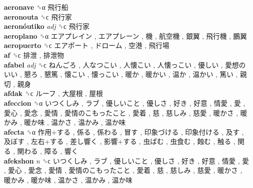 \textbf{aeronave} ␝α   飛行船   \\
\textbf{aeronouta} ␝ϲ   飛行家   \\
\textbf{aeronóutiko} \emph{adj}  ␝ϲ   飛行家   \\
\textbf{aeroplano} ␝α   エアプレイン ,  エアプレーン ,  機 ,  航空機 ,  銀翼 ,  飛行機 ,  鵬翼   \\
\textbf{aeropuerto} ␝ϲ   エアポート ,  ドローム ,  空港 ,  飛行場   \\
\textbf{af} ␝ϲ   排泄 ,  排泄物   \\
\textbf{afabel} \emph{adj}  ␝ϲ   ねんごろ ,  人なつこい ,  人懐こい ,  人懐っこい ,  優しい ,  愛想のいい ,  懇ろ ,  懇篤 ,  懐こい ,  懐っこい ,  暖か ,  暖かい ,  温か ,  温かい ,  篤い ,  親切 ,  親身   \\
\textbf{afdak} ␝ϲ   ルーフ ,  大屋根 ,  屋根   \\
\textbf{afeccion} ␝α   いつくしみ ,  ラブ ,  優しいこと ,  優しさ ,  好き ,  好意 ,  情愛 ,  愛 ,  愛心 ,  愛念 ,  愛情 ,  愛情のこもったこと ,  愛着 ,  慈 ,  慈しみ ,  慈愛 ,  暖かさ ,  暖かみ ,  暖か味 ,  温かさ ,  温かみ ,  温か味   \\
\textbf{afecta} ␝α   作用+する ,  係る ,  係わる ,  冒す ,  印象づける ,  印象付ける ,  及す ,  及ぼす ,  左右+する ,  差し響く ,  影響+する ,  虫ばむ ,  虫食む ,  蝕む ,  触る ,  関る ,  関わる ,  障る ,  響く   \\
\textbf{afekshon} \emph{n}  ␝ϲ   いつくしみ ,  ラブ ,  優しいこと ,  優しさ ,  好き ,  好意 ,  情愛 ,  愛 ,  愛心 ,  愛念 ,  愛情 ,  愛情のこもったこと ,  愛着 ,  慈 ,  慈しみ ,  慈愛 ,  暖かさ ,  暖かみ ,  暖か味 ,  温かさ ,  温かみ ,  温か味   \\
